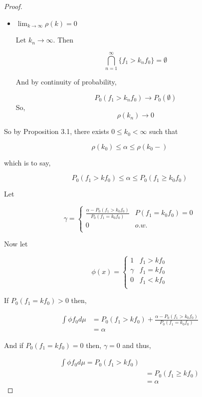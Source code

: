 \documentclass[11pt,fleqn]{book} %
\begin{document}
\begin{proof}
\begin{itemize}
				\item $\lim_{k \rightarrow \infty} \rho(k) = 0$

						Let $k_n \rightarrow \infty$. Then

						$$\bigcap^\infty_{n = 1} \{f_1 > k_n f_0\} = \emptyset$$ 
								
						And by continuity of probability, 

								$$P_0( f_1 > k_n f_0) \rightarrow P_0(\emptyset) $$ 	
						So,
								$$\rho(k_n) \rightarrow 0 $$ 	
 			\end{itemize}

So by Proposition 3.1, there exists $0 \leq k_0 < \infty$ such that

		$$\rho(k_0) \leq \alpha \leq \rho(k_0-) $$

which is to say, 

		$$P_0(f_1 > k f_0) \leq \alpha \leq P_0(f_1 \geq k_0 f_0) $$

Let 

		$$\gamma = \left\{\begin{array}{ll}
			\frac{\alpha - P_0(f_1 > k_0 f_0)}{P_0(f_1 = k_0 f_0)} & P(f_1 = k_0 f_0) = 0\\
			0 & o.w.\\
		\end{array} \right. $$

Now let 

		$$\phi(x) = \left\{\begin{array}{ll}
 				1 & f_1 > k f_0\\
 				\gamma & f_1 = k f_0\\
 				0 & f_1 < k f_0\\
 			\end{array} \right. $$

 	If $P_0(f_1 = k f_0) > 0$ then, 

 			\begin{align*}
 				\int \phi f_0 d\mu &= P_0(f_1 > k f_0) + \frac{\alpha - P_0(f_1 > k_0 f_0)}{P_0(f_1 = k_0 f_0)}\\
 					&=\alpha
 			\end{align*}

 	And if $P_0(f_1 = k f_0) = 0$ then, $\gamma = 0$ and thus,

 			\begin{align*}
 				\int \phi f_0 d\mu = P_0(f_1 > k f_0) \\
 				 	&= P_0(f_1 \geq k f_0)	\\
 					&=\alpha
 			\end{align*}


\end{proof}
\end{document}
